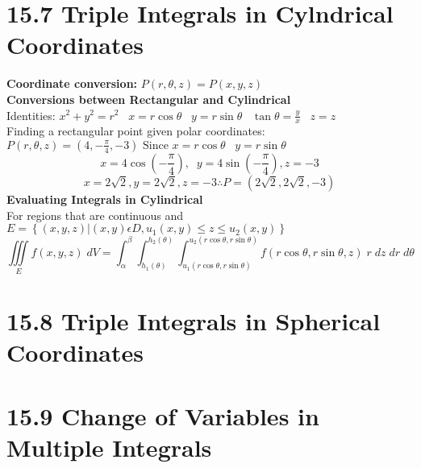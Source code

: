 \documentclass{article}
\begin{document}
\section*{15.7 Triple Integrals in Cylndrical Coordinates}
\textbf{Coordinate conversion:} $P(r,\theta, z) = P(x,y,z)$\\
\textbf{Conversions between Rectangular and Cylindrical}
 \\Identities: $x^2+y^2=r^2 \; \; \; x=r\cos\theta \; \; \; y=r\sin\theta \;\;\; \tan \theta = \frac{y}{x} \;\;\; z=z$
\\Finding a rectangular point given polar coordinates:\\[0.05in]
$P(r,\theta, z) = (4,-\frac{\pi}{4},-3)\text{ Since }x=r\cos\theta \; \; \; y=r\sin\theta \;\;\;$
$$x=4\cos\left(-\frac{\pi}{4}\right), \;\; y=4\sin\left(-\frac{\pi}{4}\right), z=-3$$
$$ x=2\sqrt{2}, y=2\sqrt{2}, z=-3 \therefore P=(2\sqrt{2},2\sqrt{2}, -3)$$
\textbf{Evaluating Integrals in Cylindrical}\\
For regions that are continuous and
$E=\left\{(x,y,z)|(x,y)\epsilon D, u_1 (x,y) \leq z \leq u_2(x,y)\right\}$
$$\iiint\limits_{E} f(x,y,z)\; dV =   \int_{\alpha}^{\beta} \int_{h_1(\theta)}^{h_2(\theta)} \int_{u_1(r \cos \theta, r\sin\theta)}^{u_2(r \cos \theta, r\sin\theta)} f(r \cos \theta, r\sin\theta,z) \; r \; dz \; dr \; d\theta$$

\section*{15.8 Triple Integrals in Spherical Coordinates}
\section*{15.9 Change of Variables in Multiple Integrals}
\end{document}
